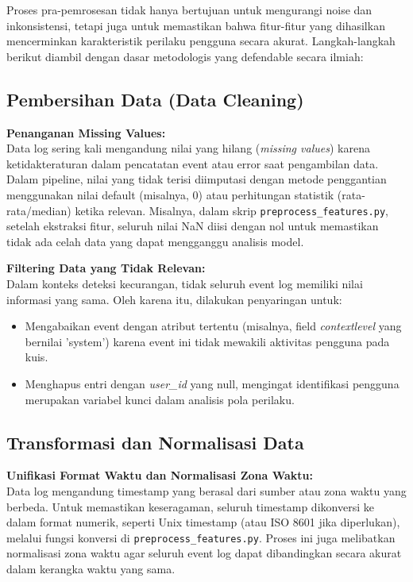 Proses pra-pemrosesan tidak hanya bertujuan untuk mengurangi noise dan inkonsistensi, tetapi juga untuk memastikan bahwa fitur-fitur yang dihasilkan mencerminkan karakteristik perilaku pengguna secara akurat. Langkah-langkah berikut diambil dengan dasar metodologis yang defendable secara ilmiah:

\subsection{Pembersihan Data (Data Cleaning)}
\label{sec:pembersihanData}
\textbf{Penanganan Missing Values:} \\
Data log sering kali mengandung nilai yang hilang (\textit{missing values}) karena ketidakteraturan dalam pencatatan event atau error saat pengambilan data. Dalam pipeline, nilai yang tidak terisi diimputasi dengan metode penggantian menggunakan nilai default (misalnya, 0) atau perhitungan statistik (rata-rata/median) ketika relevan. Misalnya, dalam skrip \texttt{preprocess\_features.py}, setelah ekstraksi fitur, seluruh nilai NaN diisi dengan nol untuk memastikan tidak ada celah data yang dapat mengganggu analisis model.

\textbf{Filtering Data yang Tidak Relevan:} \\
Dalam konteks deteksi kecurangan, tidak seluruh event log memiliki nilai informasi yang sama. Oleh karena itu, dilakukan penyaringan untuk:
\begin{itemize}
    \item Mengabaikan event dengan atribut tertentu (misalnya, field \textit{contextlevel} yang bernilai 'system') karena event ini tidak mewakili aktivitas pengguna pada kuis.
    \item Menghapus entri dengan \textit{user\_id} yang null, mengingat identifikasi pengguna merupakan variabel kunci dalam analisis pola perilaku.
\end{itemize}

\subsection{Transformasi dan Normalisasi Data}
\label{sec:transformasiNormalisasiData}
\textbf{Unifikasi Format Waktu dan Normalisasi Zona Waktu:} \\
Data log mengandung timestamp yang berasal dari sumber atau zona waktu yang berbeda. Untuk memastikan keseragaman, seluruh timestamp dikonversi ke dalam format numerik, seperti Unix timestamp (atau ISO 8601 jika diperlukan), melalui fungsi konversi di \texttt{preprocess\_features.py}. Proses ini juga melibatkan normalisasi zona waktu agar seluruh event log dapat dibandingkan secara akurat dalam kerangka waktu yang sama.

